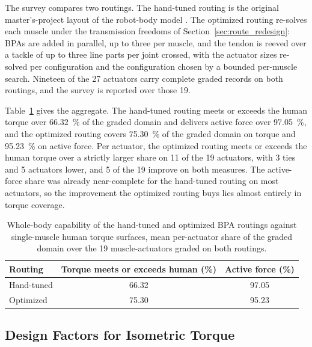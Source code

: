 \documentclass[utf8]{FrontiersinHarvard} %
\renewcommand{\arraystretch}{2}  %
\begin{document}
The survey compares two routings. The hand-tuned routing is the original master's-project layout of the robot-body model \citep{morrow_optimization_2020}. The optimized routing re-solves each muscle under the transmission freedoms of Section~\ref{sec:route_redesign}: BPAs are added in parallel, up to three per muscle, and the tendon is reeved over a tackle of up to three line parts per joint crossed, with the actuator sizes re-solved per configuration and the configuration chosen by a bounded per-muscle search. Nineteen of the 27 actuators carry complete graded records on both routings, and the survey is reported over those 19.

Table~\ref{tab:CapabilitySurvey} gives the aggregate. The hand-tuned routing meets or exceeds the human torque over \qty{66.32}{\percent} of the graded domain and delivers active force over \qty{97.05}{\percent}, and the optimized routing covers \qty{75.30}{\percent} of the graded domain on torque and \qty{95.23}{\percent} on active force. Per actuator, the optimized routing meets or exceeds the human torque over a strictly larger share on 11 of the 19 actuators, with 3 ties and 5 actuators lower, and 5 of the 19 improve on both measures. The active-force share was already near-complete for the hand-tuned routing on most actuators, so the improvement the optimized routing buys lies almost entirely in torque coverage.

\begin{table}[H]
\caption{Whole-body capability of the hand-tuned and optimized BPA routings against single-muscle human torque surfaces, mean per-actuator share of the graded domain over the 19 muscle-actuators graded on both routings.}
\label{tab:CapabilitySurvey}
\begingroup
\renewcommand{\arraystretch}{1.4}%
\fontsize{10pt}{12pt}\selectfont
\begin{tabular}{@{}lcc@{}}
\toprule
\textbf{Routing} & \textbf{Torque meets or exceeds human (\%)} & \textbf{Active force (\%)} \\
\midrule
Hand-tuned & 66.32 & 97.05 \\
Optimized & 75.30 & 95.23 \\
\bottomrule
\end{tabular}
\endgroup
\end{table}

\subsection{Design Factors for Isometric Torque}\label{sec:design_factors}
\end{document}
